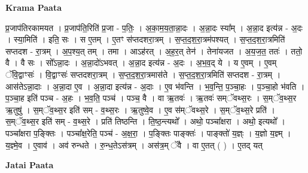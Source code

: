 \documentclass[17pt]{extarticle}
\begin{document}
\textbf{Krama Paata} \newline

प्र॒जाप॑तिरकामयत । प्र॒जाप॑ति॒रिति॑ प्र॒जा - प॒तिः॒ । अ॒का॒म॒य॒ता॒न्ना॒दः । अ॒न्ना॒दः स्या᳚म् । अ॒न्ना॒द इत्य॑न्न - अ॒दः । स्या॒मिति॑ । इति॒ सः । स ए॒तम् । ए॒तꣳ स॑प्तदशरा॒त्रम् । स॒प्त॒द॒श॒रा॒त्रम॑पश्यत् । स॒प्त॒द॒श॒रा॒त्रमिति॑ सप्तदश - रा॒त्रम् । अ॒प॒श्य॒त् तम् । तमा । आऽह॑रत् । अ॒ह॒र॒त् तेन॑ । तेना॑यजत । अ॒य॒ज॒त॒ ततः॑ । ततो॒ वै । वै सः । सो᳚ऽन्ना॒दः । अ॒न्ना॒दो॑ऽभवत् । अ॒न्ना॒द इत्य॑न्न - अ॒दः । अ॒भ॒व॒द् ये । य ए॒वम् । ए॒वम् ॅवि॒द्वाꣳसः॑ । वि॒द्वाꣳसः॑ सप्तदशरा॒त्रम् । स॒प्त॒द॒श॒रा॒त्रमास॑ते । स॒प्त॒द॒श॒रा॒त्रमिति॑ सप्तदश - रा॒त्रम् । आस॑तेऽन्ना॒दाः । अ॒न्ना॒दा ए॒व । अ॒न्ना॒दा इत्य॑न्न - अ॒दाः । ए॒व भ॑वन्ति । भ॒व॒न्ति॒ प॒ञ्चा॒हः । प॒ञ्चा॒हो भ॑वति । प॒ञ्चा॒ह इति॑ पञ्च - अ॒हः । भ॒व॒ति॒ पञ्च॑ । पञ्च॒ वै । वा ऋ॒तवः॑ । ऋ॒तवः॑ सम्ॅवथ्स॒रः । स॒म्ॅव॒थ्स॒र ऋ॒तुषु॑ । स॒म्ॅव॒थ्स॒र इति॑ सम् - व॒थ्स॒रः । ऋ॒तुष्वे॒व । ए॒व स॑म्ॅवथ्स॒रे । स॒म्ॅव॒थ्स॒रे प्रति॑ । स॒म्ॅव॒थ्स॒र इति॑ सम् - व॒थ्स॒रे । प्रति॑ तिष्ठन्ति । ति॒ष्ठ॒न्त्यथो᳚ । अथो॒ पञ्चा᳚क्षरा । अथो॒ इत्यथो᳚ । पञ्चा᳚क्षरा प॒ङ्‍क्तिः । पञ्चा᳚क्ष॒रेति॒ पञ्च॑ - अ॒क्ष॒रा॒ । प॒ङ्‍क्तिः पाङ्‍क्तः॑ । पाङ्‍क्तो॑ य॒ज्ञ्ः । य॒ज्ञो य॒ज्ञ्म् । य॒ज्ञ्मे॒व । ए॒वाव॑ । अव॑ रुन्धते । रु॒न्ध॒तेऽस॑त्रम् । अस॑त्र॒म् ॅवै । वा ए॒तत् ( ) । ए॒तद् यत् \newline

\textbf{Jatai Paata} \newline
\end{document}

